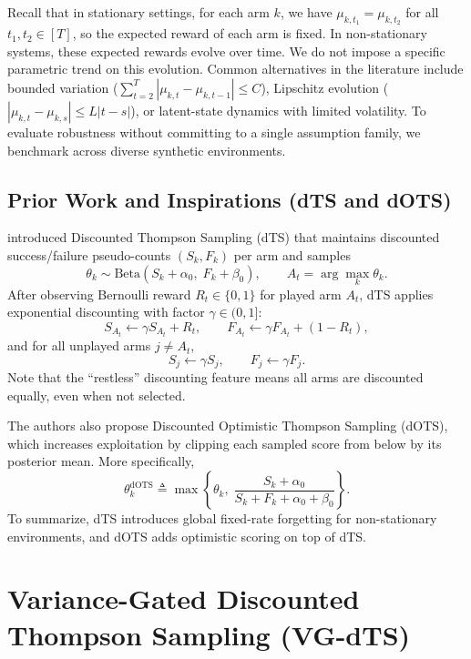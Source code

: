 \documentclass{article}
\begin{document}
Recall that in stationary settings, for each arm $k$, we have $\mu_{k,t_1}=\mu_{k,t_2}$ for all $t_1,t_2 \in [T]$, so the expected reward of each arm is fixed.
In non-stationary systems, these expected rewards evolve over time. We do not impose a specific parametric trend on this evolution.
Common alternatives in the literature include bounded variation
($\sum_{t=2}^T|\mu_{k,t}-\mu_{k,t-1}| \leq C$), Lipschitz evolution
($|\mu_{k,t}-\mu_{k,s}| \leq L|t-s|$), or latent-state dynamics with limited volatility.
To evaluate robustness without committing to a single assumption family, we benchmark across diverse synthetic environments.

\subsection{Prior Work and Inspirations (dTS and dOTS)}
\cite{raj2017taming} introduced Discounted Thompson Sampling (dTS) that maintains discounted success/failure pseudo-counts $(S_k,F_k)$ per arm and samples
\[
\theta_k \sim \mathrm{Beta}(S_k+\alpha_0,\;F_k+\beta_0),\qquad
A_t=\arg\max_k \theta_k.
\]
After observing Bernoulli reward $R_t\in\{0,1\}$ for played arm $A_t$, dTS applies exponential discounting with factor $\gamma\in(0,1]$:
\[
S_{A_t}\leftarrow \gamma S_{A_t}+R_t,\qquad
F_{A_t}\leftarrow \gamma F_{A_t}+(1-R_t),
\]
and for all unplayed arms $j\neq A_t$,
\[
S_j\leftarrow \gamma S_j,\qquad F_j\leftarrow \gamma F_j.
\]
Note that the ``restless'' discounting feature means all arms are discounted equally, even when not selected.

The authors also propose Discounted Optimistic Thompson Sampling (dOTS), which increases exploitation by clipping each sampled score from below by its posterior mean. More specifically, 
\[
\theta_k^{\mathrm{dOTS}} \triangleq
\max\!\left\{
\theta_k,\;
\frac{S_k+\alpha_0}{S_k+F_k+\alpha_0+\beta_0}
\right\}.
\]
To summarize, dTS introduces global fixed-rate forgetting for non-stationary environments, and dOTS adds optimistic scoring on top of dTS.


\section{Variance-Gated Discounted Thompson Sampling (VG-dTS)}
\end{document}
